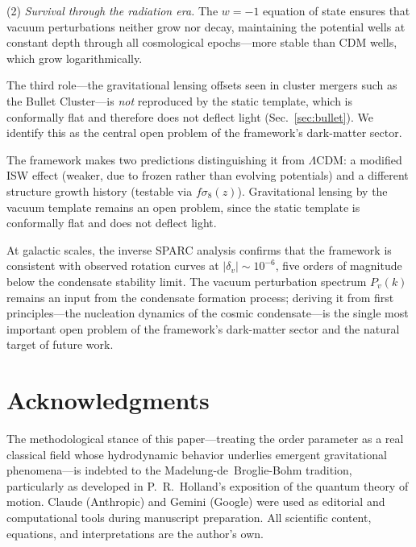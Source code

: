 \documentclass[12pt, a4paper]{article}
\begin{document}
(2) \emph{Survival through the radiation era.} The $w = -1$ equation of state ensures that vacuum perturbations neither grow nor decay, maintaining the potential wells at constant depth through all cosmological epochs---more stable than CDM wells, which grow logarithmically.

The third role---the gravitational lensing offsets seen in cluster mergers such as the Bullet Cluster---is \emph{not} reproduced by the static template, which is conformally flat and therefore does not deflect light (Sec.~\ref{sec:bullet}). We identify this as the central open problem of the framework's dark-matter sector.

The framework makes two predictions distinguishing it from $\Lambda$CDM: a modified ISW effect (weaker, due to frozen rather than evolving potentials) and a different structure growth history (testable via $f\sigma_8(z)$). Gravitational lensing by the vacuum template remains an open problem, since the static template is conformally flat and does not deflect light.

At galactic scales, the inverse SPARC analysis confirms that the framework is consistent with observed rotation curves at $|\delta_v| \sim 10^{-6}$, five orders of magnitude below the condensate stability limit. The vacuum perturbation spectrum $P_v(k)$ remains an input from the condensate formation process; deriving it from first principles---the nucleation dynamics of the cosmic condensate---is the single most important open problem of the framework's dark-matter sector and the natural target of future work.

\section*{Acknowledgments}

The methodological stance of this paper---treating the order parameter as a real classical field whose hydrodynamic behavior underlies emergent gravitational phenomena---is indebted to the Madelung-de~Broglie-Bohm tradition, particularly as developed in P.~R.~Holland's exposition of the quantum theory of motion. Claude (Anthropic) and Gemini (Google) were used as editorial and computational tools during manuscript preparation. All scientific content, equations, and interpretations are the author's own.
\end{document}
